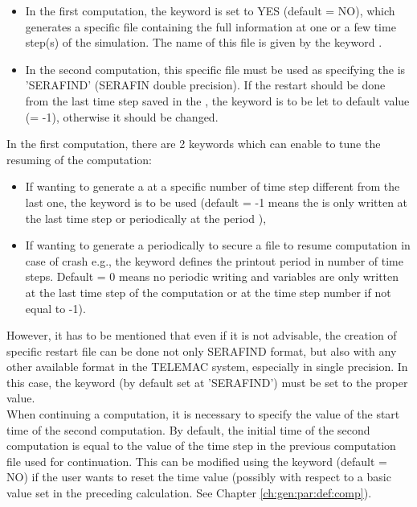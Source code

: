 \begin{itemize}
\item In the first computation, the keyword  is set to
YES (default = NO),
which generates a specific file containing the full information at one or a
few time step(s) of the simulation.
The name of this file is given by the keyword .

\item In the second computation, this specific file must be used as
 specifying the  is 'SERAFIND' (SERAFIN double precision).
If the restart should be done from the last time step saved in the
, the keyword  is to be
let to default value (= -1), otherwise it should be changed.
\end{itemize}

In the first computation, there are 2 keywords which can enable to tune the
resuming of the computation:
\begin{itemize}
\item If wanting to generate a  at a specific number of
time step different from the last one, the keyword
 is to be used
(default = -1 means the  is only written at the last
time step or periodically at the period ),
\item If wanting to generate a  periodically to secure a
file to resume computation in case of crash e.g., the keyword
 defines the printout period in number of
time steps.
Default = 0 means no periodic writing and variables are only written at the last
time step of the computation or at the time step number
 if not equal to -1).
\end{itemize}

However, it has to be mentioned that even if it is not advisable, the creation
of specific restart file can be done not only SERAFIND format, but also with
any other available format in the TELEMAC system, especially in single
precision. In this case, the keyword  (by default
set at 'SERAFIND') must be set to the proper value.
\\

When continuing a computation, it is necessary to specify the value of
the start time of the second computation.
By default, the initial time of the second computation is equal to the value
of the time step in the previous computation file used for continuation.
This can be modified using the keyword 
(default = NO)
if the user wants to reset the time value (possibly with respect to a basic
value set in the preceding calculation.
See Chapter \ref{ch:gen:par:def:comp}).


